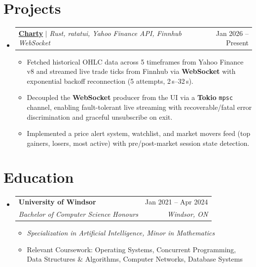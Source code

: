 \documentclass[letterpaper,11pt]{article}
\makeatletter
\newcommand{\resumeItem}[1]{
  \item\small{
    {#1 \vspace{-2pt}}
  }
}
\newcommand{\resumeSubheading}[4]{
  \vspace{-2pt}\item
    \begin{tabular*}{0.97\textwidth}[t]{l@{\extracolsep{\fill}}r}
      \textbf{#1} & #2 \\
      \textit{\small#3} & \textit{\small #4} \\
    \end{tabular*}\vspace{-7pt}
}
\newcommand{\resumeProjectHeading}[2]{
    \item
    \begin{tabular*}{0.97\textwidth}{l@{\extracolsep{\fill}}r}
      \small#1 & #2 \\
    \end{tabular*}\vspace{-7pt}
}
\newcommand{\resumeSubHeadingListStart}{\begin{itemize}[leftmargin=0.15in, label={}]}
\newcommand{\resumeSubHeadingListEnd}{\end{itemize}}
\newcommand{\resumeItemListStart}{\begin{itemize}}
\newcommand{\resumeItemListEnd}{\end{itemize}\vspace{-5pt}}
\makeatother
\begin{document}
\section{Projects}
  \resumeSubHeadingListStart
    \resumeProjectHeading
        {\href{https://github.com/Cyoger/charty}{\textbf{Charty}} $|$ \emph{Rust, ratatui, Yahoo Finance API, Finnhub WebSocket}}{Jan 2026 -- Present}
          \resumeItemListStart
            \resumeItem{Fetched historical OHLC data across 5 timeframes from Yahoo Finance v8 and streamed live trade ticks from Finnhub via \textbf{WebSocket} with exponential backoff reconnection (5 attempts, 2\,s--32\,s).}
            \resumeItem{Decoupled the \textbf{WebSocket} producer from the UI via a \textbf{Tokio} \texttt{mpsc} channel, enabling fault-tolerant live streaming with recoverable/fatal error discrimination and graceful unsubscribe on exit.}
            \resumeItem{Implemented a price alert system, watchlist, and market movers feed (top gainers, losers, most active) with pre/post-market session state detection.}
          \resumeItemListEnd
  \resumeSubHeadingListEnd 

  \section{Education}
  \resumeSubHeadingListStart
    \resumeSubheading
      {University of Windsor}{Jan 2021 -- Apr 2024}
      {Bachelor of Computer Science Honours}{Windsor, ON}
    \resumeItemListStart
      \resumeItem{\textit{Specialization in Artificial Intelligence, Minor in Mathematics}}
      \resumeItem{Relevant Coursework: Operating Systems, Concurrent Programming, Data Structures \& Algorithms, Computer Networks, Database Systems}
    \resumeItemListEnd
    
  \resumeSubHeadingListEnd  

\end{document}
